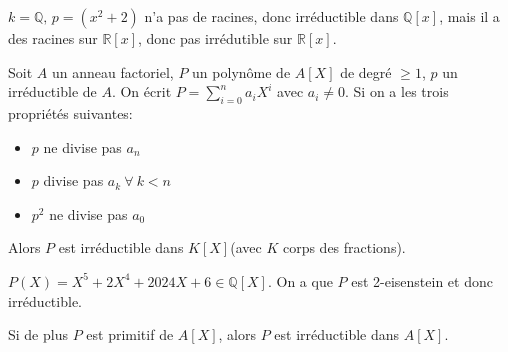 \begin{example}
	$k = \mathbb{Q}, \,p = (x^2 + 2 )$ n'a pas de racines, donc irréductible dans $\mathbb{Q}[x]$, mais il a des racines sur $\mathbb{R}[x]$, donc pas irrédutible sur $\mathbb{R}[x]$.
\end{example}

\begin{theorem}
	Soit $A$ un anneau factoriel, $P$ un polynôme  de $A[X]$ de degré $\geq 1$, $p$ un irréductible de $A$.
	On écrit $P = \sum\limits_{i=0}^n a_iX^i$ avec $a_i \neq 0$. Si on a les trois propriétés suivantes:
	\begin{itemize}
		\item $p$ ne divise pas $a_n$
		\item $p$ divise pas $a_k \ \forall \ k < n$
		\item $p^2$ ne divise pas $a_0$
	\end{itemize}
	Alors $P$ est irréductible dans $K[X]$(avec $K$ corps des fractions).
\end{theorem}

\begin{example}
	$P(X) = X^5 + 2X^4 + 2024X + 6\in \mathbb{Q}[X]$. On a que $P$ est 2-eisenstein et donc irréductible.
\end{example}

\begin{coro}
	Si de plus $P$ est primitif de $A[X]$, alors $P$ est irréductible dans $A[X]$.
\end{coro}
